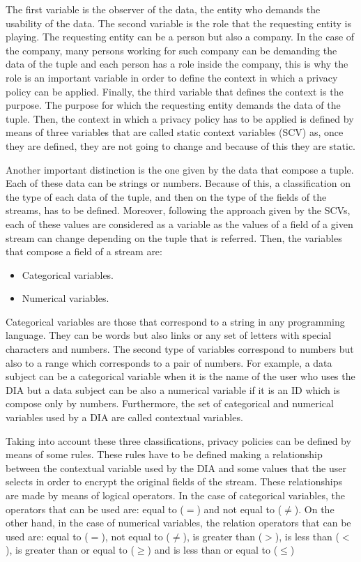 The first variable is the observer of the data, the entity who demands the usability of the data. The second variable is the role that the requesting entity is playing. The requesting entity can be a person but also a company. In the case of the company, many persons working for such company can be demanding the data of the tuple and each person has a role inside the company, this is why the role is an important variable in order to define the context in which a privacy policy can be applied. Finally, the third variable that defines the context is the purpose. The purpose for which the requesting entity demands the data of the tuple. Then, the context in which a privacy policy has to be applied is defined by means of three variables that are called static context variables (SCV) as, once they are defined, they are not going to change and because of this they are static.

Another important distinction is the one given by the data that compose a tuple. Each of these data can be strings or numbers. Because of this, a classification on the type of each data of the tuple, and then on the type of the fields of the streams, has to be defined. Moreover, following the approach given by the SCVs, each of these values are considered as a variable as the values of a field of a given stream can change depending on the tuple that is referred. Then, the variables that compose a field of a stream are:

\begin{itemize}

\item Categorical variables.
\item Numerical variables.

\end{itemize}

Categorical variables are those that correspond to a string in any programming language. They can be words but also links or any set of letters with special characters and numbers. The second type of variables correspond to numbers but also to a range which corresponds to a pair of numbers. For example, a data subject can be a categorical variable when it is the name of the user who uses the DIA but a data subject can be also a numerical variable if it is an ID which is compose only by numbers. Furthermore, the set of categorical and numerical variables used by a DIA are called contextual variables.

Taking into account these three classifications, privacy policies can be defined by means of some rules. These rules have to be defined making a relationship between the contextual variable used by the DIA and some values that the user selects in order to encrypt the original fields of the stream. These relationships are made by means of logical operators. In the case of categorical variables, the operators that can be used are: equal to ($=$) and not equal to ($\neq$). On the other hand, in the case of numerical variables, the relation operators that can be used are: equal to ($=$), not equal to ($\neq$), is greater than ($>$), is less than ($<$), is greater than or equal to ($\geq$) and is less than or equal to ($\leq$)

